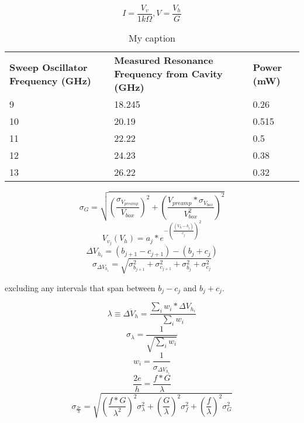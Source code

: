 \documentclass{article}
\begin{document}
\begin{equation}
I = \frac{V_v}{1k\Omega}, V = \frac{V_h}{G}
\end{equation}
\begin{table}[H]
\centering
\caption{My caption}
\label{my-label}
\begin{tabular}{lll}
\textbf{Sweep Oscillator Frequency (GHz)} & \textbf{Measured Resonance Frequency from Cavity (GHz)} & \textbf{Power (mW)} \\
9 & 18.245 & 0.26 \\
10 & 20.19 & 0.515 \\
11 & 22.22 & 0.5 \\
12 & 24.23 & 0.38 \\
13 & 26.22 & 0.32
\end{tabular}
\end{table}
\begin{equation}
\sigma_G = \sqrt{(\frac{\sigma_{V_{preamp}}}{V_{box}})^2+(\frac{V_{preamp}*\sigma_{V_{box}}}{V_{box}^2})^2}
\end{equation}
\begin{equation}
V_{v_j} (V_h) = a_j*e^{-(\frac{(V_h-b_j)}{c_j})^2 }
\end{equation}
\begin{equation}
\Delta V_{h_i} = (b_{j+1}-c_{j+1}) - (b_j + c_j)
\end{equation}
\begin{equation}
\sigma_{\Delta V_{h_i}} = \sqrt{\sigma_{b_{j+1}}^2 + \sigma_{c_{j+1}}^2 + \sigma_{b_{j}}^2 + \sigma_{c_{j}}^2}
\end{equation}
\begin{center}
excluding any intervals that span between $b_j-c_j$ and $b_j+c_j$.
\end{center}
\begin{equation}
\lambda\equiv\overline{\Delta V_h} = \frac{\sum_i w_i * \Delta V_{h_i}}{\sum_i w_i}
\end{equation}
\begin{equation}
\sigma_\lambda = \frac{1}{\sqrt{\sum_i w_i}}
\end{equation}
\begin{equation}
w_i = \frac{1}{\sigma_{\Delta V_{h_i}}}
\end{equation}
\begin{equation}
\frac{2e}{h} = \frac{f*G}{\lambda}
\end{equation}
\begin{equation}
\sigma_{\frac{2e}{h}} = 
\sqrt{(\frac{f*G}{\lambda^2})^2\sigma_\lambda^2 + (\frac{G}{\lambda})^2\sigma_f^2 + (\frac{f}{\lambda})^2\sigma_G^2}

\end{equation}
\end{document}
